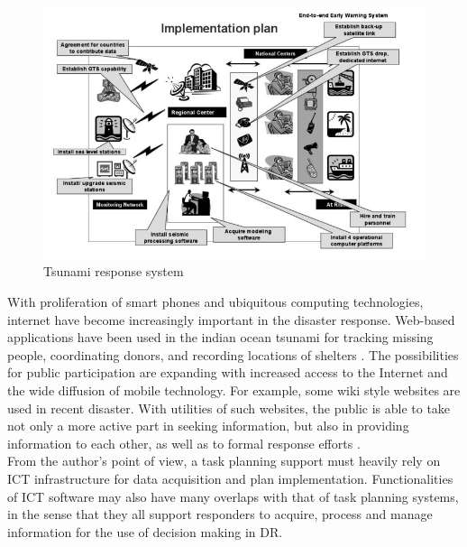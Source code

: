 \begin{figure}[h]
  \centering
  \includegraphics[width=1\textwidth]{img/background/ICTExample}
  \caption{Tsunami response system}
  \label{fig:ICTExample}
\end{figure}

With proliferation of smart phones and ubiquitous computing technologies, internet have become increasingly important in the disaster response. Web-based applications have been used in the indian ocean tsunami for tracking missing people, coordinating donors, and recording locations of shelters \cite{Wattegama2012}. The possibilities for public participation are expanding with increased access to the Internet and the wide diffusion of mobile technology. For example, some wiki style websites are used in recent disaster. With utilities of such websites, the public is able to take not only a more active part in seeking information, but also in providing information to each other, as well as to formal response efforts \cite{Palen2007}.\\

From the author's point of view, a task planning support must heavily rely on ICT infrastructure for data acquisition and plan implementation. Functionalities of ICT software may also have many overlaps with that of task planning systems, in the sense that they all support responders to acquire, process and manage information for the use of decision making in DR. \\


